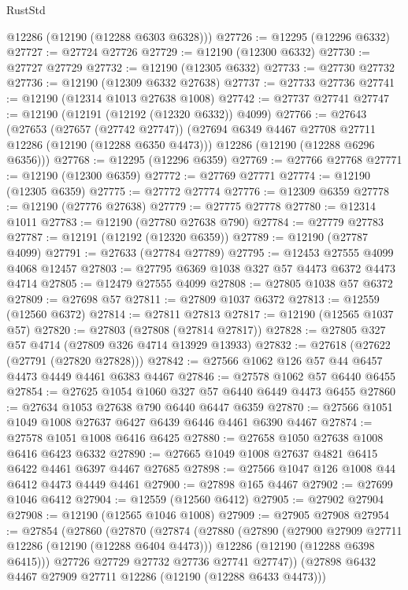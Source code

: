 \begin{lexlean}{RustStd}
\begin{coremodule}
      @12286
      (@12190 (@12288 @6303 @6328)))
@27726 := @12295 (@12296 @6332)
@27727 := @27724 @27726
@27729 := @12190 (@12300 @6332)
@27730 := @27727 @27729
@27732 := @12190 (@12305 @6332)
@27733 := @27730 @27732
@27736 := @12190 (@12309 @6332 @27638)
@27737 := @27733 @27736
@27741 := @12190 (@12314 @1013 @27638 @1008)
@27742 := @27737 @27741
@27747 := @12190 (@12191 (@12192 (@12320 @6332)) @4099)
@27766 := @27643
    (@27653
      (@27657 (@27742 @27747))
      (@27694 @6349 @4467 @27708 @27711 @12286 (@12190 (@12288 @6350 @4473)))
      @12286
      (@12190 (@12288 @6296 @6356)))
@27768 := @12295 (@12296 @6359)
@27769 := @27766 @27768
@27771 := @12190 (@12300 @6359)
@27772 := @27769 @27771
@27774 := @12190 (@12305 @6359)
@27775 := @27772 @27774
@27776 := @12309 @6359
@27778 := @12190 (@27776 @27638)
@27779 := @27775 @27778
@27780 := @12314 @1011
@27783 := @12190 (@27780 @27638 @790)
@27784 := @27779 @27783
@27787 := @12191 (@12192 (@12320 @6359))
@27789 := @12190 (@27787 @4099)
@27791 := @27633 (@27784 @27789)
@27795 := @12453 @27555 @4099 @4068 @12457
@27803 := @27795 @6369 @1038 @327 @57 @4473 @6372 @4473 @4714
@27805 := @12479 @27555 @4099
@27808 := @27805 @1038 @57 @6372
@27809 := @27698 @57
@27811 := @27809 @1037 @6372
@27813 := @12559 (@12560 @6372)
@27814 := @27811 @27813
@27817 := @12190 (@12565 @1037 @57)
@27820 := @27803 (@27808 (@27814 @27817))
@27828 := @27805 @327 @57 @4714 (@27809 @326 @4714 @13929 @13933)
@27832 := @27618 (@27622 (@27791 (@27820 @27828)))
@27842 := @27566 @1062 @126 @57 @44 @6457 @4473 @4449 @4461 @6383 @4467
@27846 := @27578 @1062 @57 @6440 @6455
@27854 := @27625 @1054 @1060 @327 @57 @6440 @6449 @4473 @6455
@27860 := @27634 @1053 @27638 @790 @6440 @6447 @6359
@27870 := @27566 @1051 @1049 @1008 @27637 @6427 @6439 @6446 @4461 @6390 @4467
@27874 := @27578 @1051 @1008 @6416 @6425
@27880 := @27658 @1050 @27638 @1008 @6416 @6423 @6332
@27890 := @27665 @1049 @1008 @27637 @4821 @6415 @6422 @4461 @6397 @4467 @27685
@27898 := @27566 @1047 @126 @1008 @44 @6412 @4473 @4449 @4461
@27900 := @27898 @165 @4467
@27902 := @27699 @1046 @6412
@27904 := @12559 (@12560 @6412)
@27905 := @27902 @27904
@27908 := @12190 (@12565 @1046 @1008)
@27909 := @27905 @27908
@27954 := @27854
    (@27860
      (@27870
        (@27874
          (@27880
            (@27890
              (@27900 @27909 @27711 @12286 (@12190 (@12288 @6404 @4473)))
              @12286
              (@12190 (@12288 @6398 @6415)))
            @27726
            @27729
            @27732
            @27736
            @27741
            @27747))
        (@27898 @6432 @4467 @27909 @27711 @12286 (@12190 (@12288 @6433 @4473)))

\end{coremodule}
\end{lexlean}
